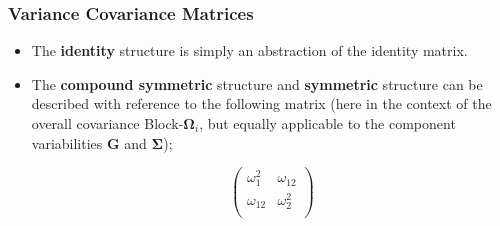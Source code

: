 \documentclass[compress]{beamer}        %
\begin{document}
\begin{frame}
	\frametitle{Variance Covariance Matrices }
	\begin{itemize}
		\item The \textbf{identity} structure is simply an abstraction of the identity matrix. 
		\item The \textbf{compound symmetric} structure and \textbf{symmetric} structure can be described with reference to the following matrix (here in the context of the overall covariance Block-$\boldsymbol{\Omega}_i$, but equally applicable to the component variabilities $\boldsymbol{G}$ and $\boldsymbol{\Sigma}$);
		
		\[\left( \begin{array}{cc}
		\omega^2_1  & \omega_{12} \\
		\omega_{12} & \omega^2_2 \\
		\end{array}\right) \]
	\end{itemize}
\end{frame}
\end{document}
